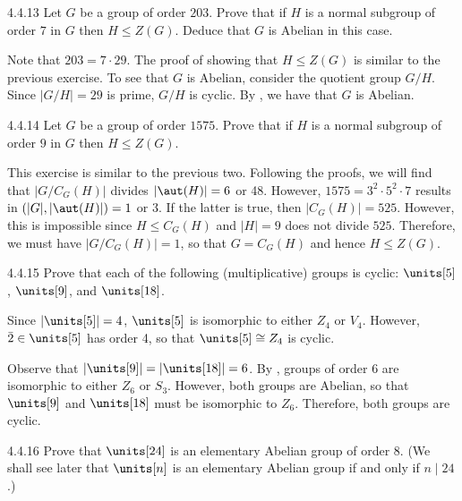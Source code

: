 \begin{exercise}{4.4.13}
	Let $G$ be a group of order $203$.
	Prove that if $H$ is a normal subgroup of order $7$ in $G$ then $H \le Z(G)$.
	Deduce that $G$ is Abelian in this case.
\end{exercise}

\begin{sol}
	Note that $203 = 7 \cdot 29$.
	The proof of showing that $H \leq Z(G)$ is similar to the previous exercise.
	To see that $G$ is Abelian, consider the quotient group $G/H$.
	Since $|G/H| = 29$ is prime, $G/H$ is cyclic.
	By , we have that $G$ is Abelian.
\end{sol}

\begin{exercise}{4.4.14}
	Let $G$ be a group of order $1575$.
	Prove that if $H$ is a normal subgroup of order $9$ in $G$ then $H \le Z(G)$.
\end{exercise}

\begin{sol}
	This exercise is similar to the previous two.
	Following the proofs, we will find that $|G/C_G(H)|$ divides $|\aut(H)| = 6$ or 48.
	However, $1575 = 3^2 \cdot 5^2 \cdot 7$ results in $(|G|, |\aut(H)|) = 1$ or 3.
	If the latter is true, then $|C_G(H)| = 525$.
	However, this is impossible since $H \leq C_G(H)$ and $|H| = 9$ does not divide $525$.
	Therefore, we must have $|G/C_G(H)| = 1$, so that $G = C_G(H)$ and hence $H \leq Z(G)$.
\end{sol}

\begin{exercise}{4.4.15}
	Prove that each of the following (multiplicative) groups is cyclic: $\units[5]$, $\units[9]$, and $\units[18]$.
\end{exercise}

\begin{sol}
	Since $|\units[5]| = 4$, $\units[5]$ is isomorphic to either $Z_4$ or $V_4$.
	However, $\bar 2 \in \units[5]$ has order 4, so that $\units[5] \cong Z_4$ is cyclic.

	Observe that $|\units[9]| = |\units[18]| = 6$.
	By , groups of order 6 are isomorphic to either $Z_6$ or $S_3$.
	However, both groups are Abelian, so that $\units[9]$ and $\units[18]$ must be isomorphic to $Z_6$.
	Therefore, both groups are cyclic.
\end{sol}

\begin{spex}{4.4.16}
	Prove that $\units[24]$ is an elementary Abelian group of order $8$. (We shall see later that $\units[n]$ is an elementary Abelian group if and only if $n \mid 24$.)
\end{spex}

